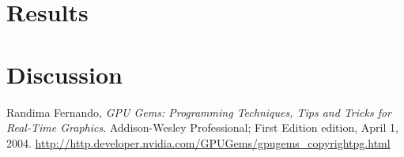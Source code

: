 \documentclass[a4paper, 12pt]{article}
\begin{document}
\section{Results}
\section{Discussion }


\begin{thebibliography}{9}
	Randima Fernando,
	\emph{GPU Gems: Programming Techniques, Tips and Tricks for Real-Time
	Graphics}.
	Addison-Wesley Professional; First Edition edition, April 1, 2004.
	\url{http://http.developer.nvidia.com/GPUGems/gpugems\_copyrightpg.html}
\end{thebibliography}
\end{document}
